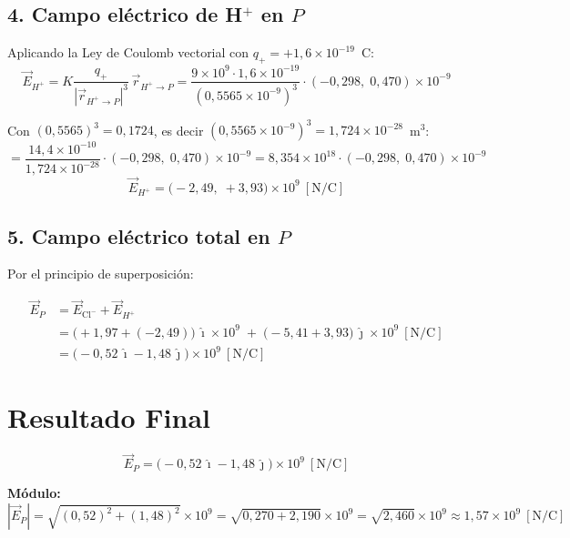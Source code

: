 \documentclass[12pt,letterpaper]{article}
\begin{document}
\subsection*{4.\; Campo el\'ectrico de H$^+$ en $P$}

Aplicando la Ley de Coulomb vectorial con $q_+ = +1{,}6\times10^{-19}$~C:
\[
\vec{E}_{H^+}
= K\frac{q_+}{|\vec{r}_{H^+\to P}|^3}\,\vec{r}_{H^+\to P}
= \frac{9\times10^{9}\cdot1{,}6\times10^{-19}}{(0{,}5565\times10^{-9})^3}
  \cdot(-0{,}298,\;0{,}470)\times10^{-9}
\]

Con $(0{,}5565)^3 = 0{,}1724$, es decir $(0{,}5565\times10^{-9})^3 = 1{,}724\times10^{-28}$~m$^3$:
\[
= \frac{14{,}4\times10^{-10}}{1{,}724\times10^{-28}}
  \cdot(-0{,}298,\;0{,}470)\times10^{-9}
= 8{,}354\times10^{18}\cdot(-0{,}298,\;0{,}470)\times10^{-9}
\]
\[
\vec{E}_{H^+}
= \bigl(-2{,}49,\;+3{,}93\bigr)\times10^{9}\ [\text{N/C}]
\]

\subsection*{5.\; Campo el\'ectrico total en $P$}

Por el principio de superposici\'on:

\begin{align*}
\vec{E}_P
&= \vec{E}_{\text{Cl}^-} + \vec{E}_{H^+} \\[6pt]
&= \bigl(+1{,}97 + (-2{,}49)\bigr)\,\hat{\imath}\times10^{9}
   \;+\; \bigl(-5{,}41 + 3{,}93\bigr)\,\hat{\jmath}\times10^{9}\ [\text{N/C}]\\[6pt]
&= \bigl(-0{,}52\,\hat{\imath} - 1{,}48\,\hat{\jmath}\bigr)\times10^{9}\ [\text{N/C}]
\end{align*}

\section*{Resultado Final}

\[
\boxed{
\vec{E}_P
= \bigl(-0{,}52\,\hat{\imath} - 1{,}48\,\hat{\jmath}\bigr)\times10^{9}\ [\text{N/C}]
}
\]

\vspace{0.4cm}

\textbf{M\'odulo:}
\[
|\vec{E}_P|
= \sqrt{(0{,}52)^2+(1{,}48)^2}\times10^{9}
= \sqrt{0{,}270 + 2{,}190}\times10^{9}
= \sqrt{2{,}460}\times10^{9}
\approx \boxed{1{,}57\times10^{9}\ [\text{N/C}]}
\]
\end{document}
